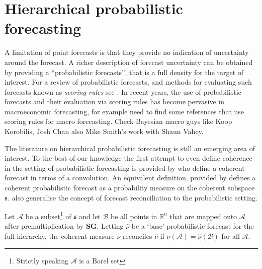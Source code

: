 \documentclass[graybox]{svmult}
\begin{document}
\clearpage
\section{Hierarchical probabilistic forecasting}

A limitation of point forecasts is that they provide no indication of uncertainty around the forecast. A richer description of forecast uncertainty can be obtained by providing a ``probabilistic forecasts'', that is a full density for the target of interest. For a review of probabilistic forecasts, and methods for evaluating such forecasts known as {\em scoring rules} see  \citep{Gneiting2014}. In recent years, the use of probabilistic forecasts and their evaluation via scoring rules has become pervasive in macroeconomic forecasting, for example {\color{red} need to find some references that use scoring rules for macro forecasting.  Check Bayesian macro guys like Koop Korobilis, Josh Chan also Mike Smith's work with Shaun Vahey}.


The literature on hierarchical probabilistic forecasting is still an emerging area of interest. %
To the best of our knowledge the first attempt to even define coherence in the setting of probabilistic forecasting is provided by \cite{Taieb2017} who define a coherent forecast in terms of a convolution.  An equivalent definition, provided by \cite{Gamakumara2018} defines a  coherent probabilistic forecast as a probability measure on the coherent subspace $\mathfrak{s}$.  \cite{Gamakumara2018} also generalise the concept of forecast reconciliation to the probabilistic setting.

\begin{definition} Let $\mathcal{A}$ be a subset\footnote{Strictly speaking $\mathcal{A}$ is a Borel set} of $\mathfrak{s}$ and let $\mathcal{B}$ be all points in $\mathbb{R}^n$ that are mapped onto  $\mathcal{A}$ after premultiplication by $\bm{S}\bm{G}$. Letting $\hat{\nu}$ be a `base' probabilistic forecast for the full hierarchy, the coherent measure $\tilde{\nu}$ reconciles $\hat{\nu}$ if $\tilde{\nu}(\mathcal{A})=\hat{\nu}(\mathcal{B})$ for all $\mathcal{A}$.
\end{definition}
\end{document}
